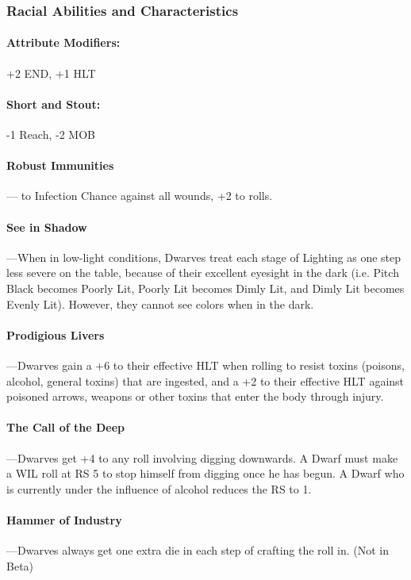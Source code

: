 \documentclass[oneside,11pt,english]{book}
\begin{document}
\subsubsection*{Racial Abilities and Characteristics} 
\paragraph{Attribute Modifiers:} +2 END, +1 HLT 
\paragraph{Short and Stout:}
-1 Reach, -2 MOB 
\paragraph{Robust Immunities}
--- to Infection Chance against all wounds, +2 to  rolls.
\paragraph{See in Shadow}\label{par:Dwarf - See in Shadow}
---\quad When in low-light conditions, Dwarves treat each stage of Lighting as
one step less severe on the table, because of their excellent eyesight in the
dark (i.e. Pitch Black becomes Poorly Lit, Poorly Lit becomes Dimly Lit, and
Dimly Lit becomes Evenly Lit). However, they cannot see colors when in the dark.
\paragraph{Prodigious Livers}
---\quad Dwarves gain a +6 to their effective HLT
when rolling to resist toxins (poisons, alcohol, general toxins) that are
ingested, and a +2 to their effective HLT against poisoned arrows, weapons or
other toxins that enter the body through injury.
\paragraph{The Call of the Deep}
---\quad Dwarves get +4 to any roll involving
digging downwards. A Dwarf must make a WIL roll at RS 5 to stop himself from
digging once he has begun. A Dwarf who is currently under the influence of
alcohol reduces the RS to 1.
\paragraph{Hammer of Industry}
---\quad Dwarves always get one extra die in each step of crafting the roll in.
(Not in Beta)
\end{document}
